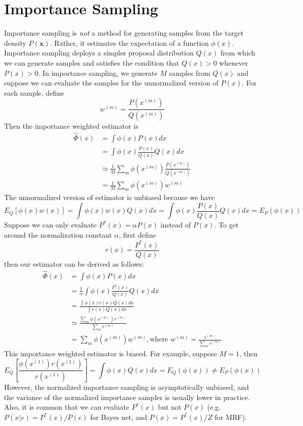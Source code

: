 \documentclass[twoside]{article}
\begin{document}
\section{Importance Sampling}
Importance sampling is \textit{not} a method for generating samples from the target density $P(\mathbf{x})$. Rather, it estimates the expectation of a function $\phi(x)$. Importance sampling deploys a simpler proposal distribution $Q(x)$ from which we can generate samples and satisfies the condition that $Q(x)>0$ whenever $P(x)>0$. In importance sampling, we generate $M$ samples from $Q(x)$ and suppose we can evaluate the samples for the unnormalized version of $P(x)$. For each sample, define
\[w^{(m)}=\frac{P(x^{(m)})}{Q(x^{(m)})}\]
Then the importance weighted estimator is
\begin{align*}
\hat{\Phi}(x) &=\int \phi(x)P(x)dx\\
&=\int \phi(x)\frac{P(x)}{Q(x)}Q(x)dx\\
&\simeq \frac{1}{M}\sum_m\phi(x^{(m)})\frac{P(x^{(m)})}{Q(x^{(m)})}\\
&=\frac{1}{M}\sum_m\phi(x^{(m)})w^{(m)}
\end{align*}
The unnormalized version of estimator is unbiased because we have
\[E_Q[\phi(x)w(x)]=\int \phi(x)w(x)Q(x)dx=\int \phi(x)\frac{P(x)}{Q(x)}Q(x)dx=E_P(\phi(x))\]
Suppose we can only evaluate $P^*(x)=\alpha P(x)$ instead of $P(x)$. To get around the normalization constant $\alpha$, first define
\[r(x)=\frac{P^*(x)}{Q(x)}\]
then our estimator can be derived as follows:
\begin{align*}
\hat{\Phi}(x) &= \int\phi(x)P(x)dx\\
&=\frac{1}{\alpha}\int \phi(x)\frac{P^*(x)}{Q(x)}Q(x)dx\\
&=\frac{\int \phi(x)r(x)Q(x)dx}{\int r(x)Q(x)dx}\\
&\simeq \frac{\sum_m\phi(x^{(m)})r^{(m)}}{\sum_mr^{(m)}}\\
&=\sum_m\phi(x^{(m)})w^{(m)}, \text{where } w^{(m)}=\frac{r^{(m)}}{\sum_mr^{(m)}}
\end{align*}
This importance weighted estimator is biased. For example, suppose $M=1$, then
\[E_Q[\frac{\phi(x^{(1)})r(x^{(1)})}{r(x^{(1)})}]=\int \phi(x)Q(x)dx=E_Q(\phi(x))\neq E_P(\phi(x))\]
However, the normalized importance sampling is asymptotically unbiased, and the variance of the normalized importance sampler is usually lower in practice. Also, it is common that we can evaluate $P^*(x)$ but not $P(x)$ (e.g. $P(x|e)=P^*(x)/P(e)$ for Bayes net, and $P(x)=P^*(x)/Z$ for MRF).
\end{document}

